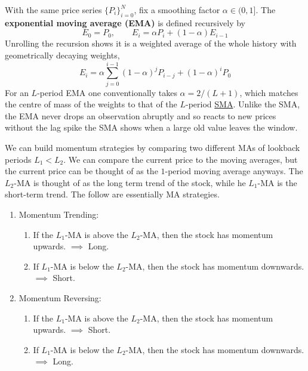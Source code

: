 \documentclass{article}
\begin{document}
    \begin{definition}
      \label{def:exponential-moving-average}
      With the same price series $\{P_i\}_{i=0}^N$, fix a smoothing factor $\alpha \in (0, 1]$. The \textbf{exponential moving average (EMA)} is defined recursively by
      \begin{equation}
        E_0 = P_0, \qquad E_i = \alpha P_i + (1 - \alpha) E_{i-1}
      \end{equation}
      Unrolling the recursion shows it is a weighted average of the whole history with geometrically decaying weights,
      \begin{equation}
        E_i = \alpha \sum_{j=0}^{i-1} (1-\alpha)^j P_{i-j} + (1-\alpha)^i P_0
      \end{equation}
      For an $L$-period EMA one conventionally takes $\alpha = 2/(L+1)$, which matches the centre of mass of the weights to that of the $L$-period \hyperref[def:simple-moving-average]{SMA}. Unlike the SMA, the EMA never drops an observation abruptly and so reacts to new prices without the lag spike the SMA shows when a large old value leaves the window. 
    \end{definition}

    We can build momentum strategies by comparing two different MAs of lookback periods $L_1 < L_2$. We can compare the current price to the moving averages, but the current price can be thought of as the $1$-period moving average anyways. The $L_2$-MA is thought of as the long term trend of the stock, while he $L_1$-MA is the short-term trend. The follow are essentially MA strategies. 
    \begin{enumerate}
        \item Momentum Trending: 
        \begin{enumerate}
            \item If the $L_1$-MA is above the $L_2$-MA, then the stock has momentum upwards. $\implies$ Long. 
            \item If $L_1$-MA is below the $L_2$-MA, then the stock has momentum downwards. $\implies$ Short. 
        \end{enumerate}
        
        \item Momentum Reversing: 
        \begin{enumerate}
            \item If the $L_1$-MA is above the $L_2$-MA, then the stock has momentum upwards. $\implies$ Short. 
            \item If $L_1$-MA is below the $L_2$-MA, then the stock has momentum downwards. $\implies$ Long. 
        \end{enumerate}
    \end{enumerate}
\end{document}
